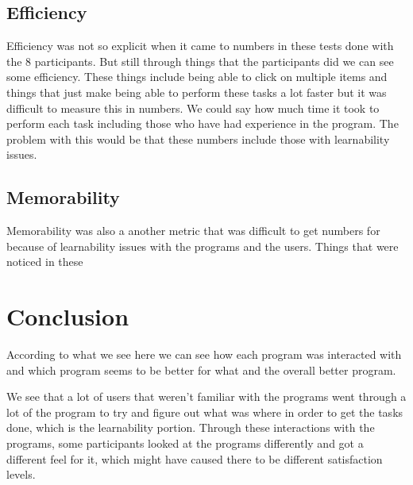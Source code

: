 \documentclass{article}
\begin{document}
\subsection{Efficiency}
Efficiency was not so explicit when it came to numbers in these tests done with the 8 participants. But still through things that the participants did we can see some efficiency. These things include being able to click on multiple items and things that just make being able to perform these tasks a lot faster but it was difficult to measure this in numbers. We could say how much time it took to perform each task including those who have had experience in the program. The problem with this would be that these numbers include those with learnability issues.

\subsection{Memorability}
Memorability was also a another metric that was difficult to get numbers for because of learnability issues with the programs and the users. Things that were noticed in these %


\section{Conclusion}
According to what we see here we can see how each program was interacted with and which program seems to be better for what and the overall better program.

We see that a lot of users that weren’t familiar with the programs went through a lot of the program to try and figure out what was where in order to get the tasks done, which is the learnability portion.  Through these interactions with the programs, some participants looked at the programs differently and got a different feel for it, which might have caused there to be different satisfaction levels.
\end{document}
